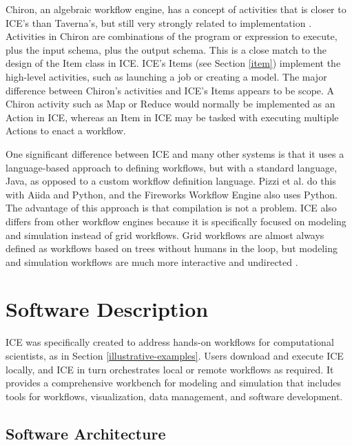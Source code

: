 Chiron, an algebraic workflow engine, has a concept of activities that is closer to ICE's than Taverna's, but still very strongly related to implementation \cite{ogasawara_chiron_2014}. Activities in Chiron are combinations of the program or expression to execute, plus the input schema, plus the output schema. This is a close match to the design of the Item class in ICE. ICE's Items (see Section \ref{item}) implement the high-level activities, such as launching a job or creating a model. The major difference between Chiron's activities and ICE's Items appears to be scope. A Chiron activity such as Map or Reduce would normally be implemented as an Action in ICE, whereas an Item in ICE may be tasked with executing multiple Actions to enact a workflow.

One significant difference between ICE and many other systems is that it uses a language-based approach to defining workflows, but with a standard language, Java, as opposed to a custom workflow definition language. Pizzi et al. do this with Aiida and Python, and the Fireworks Workflow Engine also uses Python. The advantage of this approach is that compilation is not a problem. ICE also differs from other workflow engines because it is specifically focused on modeling and simulation instead of grid workflows. Grid workflows are almost always defined as workflows based on trees without humans in the loop, but modeling and simulation workflows are much more interactive and undirected \cite{billings_toward_2017}. 

\section{Software Description}\label{software-description}

ICE was specifically created to address hands-on workflows for computational scientists, as in Section \ref{illustrative-examples}. Users download and
execute ICE locally, and ICE in turn orchestrates local or remote workflows as
required. It provides a comprehensive workbench for modeling and
simulation that includes tools for workflows, visualization, data
management, and software development.

\subsection{Software Architecture}\label{software-architecture}

